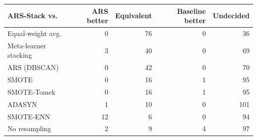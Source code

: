 \begin{tabular}{lrrrr}
\toprule
ARS-Stack vs. & ARS better & Equivalent & Baseline better & Undecided \\
\midrule
Equal-weight avg. & 0 & 76 & 0 & 36 \\
Meta-learner stacking & 3 & 40 & 0 & 69 \\
ARS (DBSCAN) & 0 & 42 & 0 & 70 \\
SMOTE & 0 & 16 & 1 & 95 \\
SMOTE-Tomek & 0 & 16 & 1 & 95 \\
ADASYN & 1 & 10 & 0 & 101 \\
SMOTE-ENN & 12 & 6 & 0 & 94 \\
No resampling & 2 & 9 & 4 & 97 \\
\bottomrule
\end{tabular}
